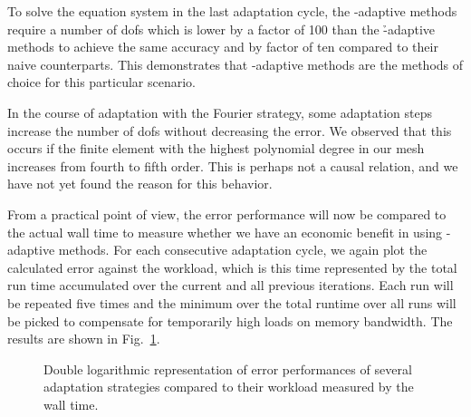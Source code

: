 To solve the equation system in the last adaptation cycle, the \hp-adaptive methods %
require a number of \glspl{dof} which is lower by a factor of 100 than the \h-adaptive methods to achieve the same accuracy
and by factor of ten compared to their naive counterparts. This demonstrates that \hp-adaptive methods are the methods of choice for this particular scenario.


In the course of adaptation with the Fourier strategy, some adaptation steps increase the number of \glspl{dof} without decreasing the error.
We observed that this occurs if the finite element with the highest polynomial degree in our mesh increases from fourth to fifth order. This is perhaps not a causal relation, and we have not yet found the reason for this behavior.





From a practical point of view, the error performance will now be compared to the actual wall time to measure whether we have an economic benefit in using \hp-adaptive methods. For each consecutive adaptation cycle, we again plot the calculated error against the workload, which is this time represented by the total run time accumulated over the current and all previous iterations. Each run will be repeated five times and the minimum over the total runtime over all runs will be picked to compensate for temporarily high loads on memory bandwidth. The results are shown in Fig.~\ref{fig:errorwalltime}.

\begin{figure}
\centering

\caption[Error performances of several adaptation strategies compared to their workload measured by the wall time.]{Double logarithmic representation of error performances of several adaptation strategies compared to their workload measured by the wall time.}
\label{fig:errorwalltime}
\end{figure}

